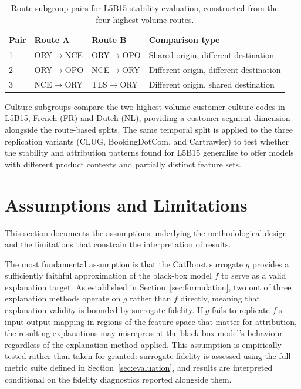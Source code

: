 \documentclass[oneside]{memoir} %
\begin{document}
\begin{table}[ht]
\caption{Route subgroup pairs for L5B15 stability evaluation, constructed from the four 
highest-volume routes.}
\label{tab:route_pairs}
\centering
\begin{tabular}{llll}
\toprule
Pair & Route A & Route B & Comparison type \\
\midrule
1 & ORY$\to$NCE & ORY$\to$OPO & Shared origin, different destination \\
2 & ORY$\to$OPO & NCE$\to$ORY & Different origin, different destination \\
3 & NCE$\to$ORY & TLS$\to$ORY & Different origin, shared destination \\
\bottomrule
\end{tabular}
\end{table}

Culture subgroups compare the two highest-volume customer culture codes in L5B15, French (FR) and Dutch (NL), providing a customer-segment dimension alongside the route-based splits. The same temporal split is applied to the three replication variants (CLUG, BookingDotCom, and Cartrawler) to test whether the stability and attribution patterns found for L5B15 generalise to offer models with different product contexts and partially distinct feature sets.

\section{Assumptions and Limitations} \label{sec:assumptions}

This section documents the assumptions underlying the methodological design and the limitations that constrain the interpretation of results.

The most fundamental assumption is that the CatBoost surrogate $g$ provides a sufficiently faithful approximation of the black-box model $f$ to serve as a valid explanation target. As established in Section~\ref{sec:formulation}, two out of three explanation methods operate on $g$ rather than $f$ directly, meaning that explanation validity is bounded by surrogate fidelity. If $g$ fails to replicate $f$'s input-output mapping in regions of the feature space that matter for attribution, the resulting explanations may misrepresent the black-box model's behaviour regardless of the explanation method applied. This assumption is empirically tested rather than taken for granted: surrogate fidelity is assessed using the full metric suite defined in Section~\ref{sec:evaluation}, and results are interpreted conditional on the fidelity diagnostics reported alongside them.
\end{document}
